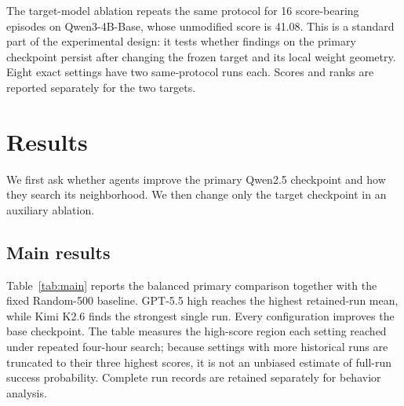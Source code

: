 \documentclass{article}
\begin{document}
The target-model ablation repeats the same protocol for 16 score-bearing episodes on Qwen3-4B-Base,
whose unmodified score is 41.08. This is a standard part of the experimental design: it
tests whether findings on the primary checkpoint persist after changing the frozen target
and its local weight geometry. Eight exact settings have two same-protocol runs each.
Scores and ranks are reported separately for the two targets.

\FloatBarrier
\section{Results}

We first ask whether agents improve the primary Qwen2.5 checkpoint and how they search its
neighborhood. We then change only the target checkpoint in an auxiliary ablation.

\subsection{Main results}

Table~\ref{tab:main} reports the balanced primary comparison together with the fixed
Random-500 baseline. GPT-5.5 high reaches the highest retained-run mean, while Kimi K2.6
finds the strongest single run. Every configuration improves the base checkpoint. The
table measures the high-score region each setting reached under repeated four-hour search;
because settings
with more historical runs are truncated to their three highest scores, it is not an
unbiased estimate of full-run success probability. Complete run records are retained
separately for behavior analysis.
\end{document}
